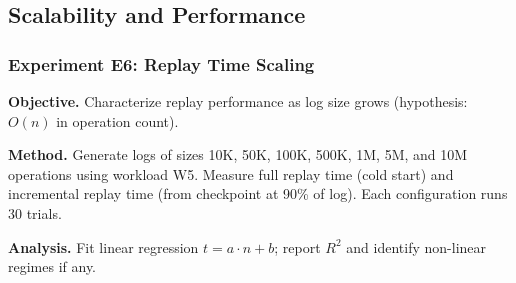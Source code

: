 \subsection{Scalability and Performance}\label{subsec:scalability}

\subsubsection{Experiment E6: Replay Time Scaling}
\textbf{Objective.} Characterize replay performance as log size grows (hypothesis: $O(n)$ in operation count).

\textbf{Method.} Generate logs of sizes 10K, 50K, 100K, 500K, 1M, 5M, and 10M operations using workload W5. Measure full replay time (cold start) and incremental replay time (from checkpoint at 90\% of log). Each configuration runs 30 trials.

\textbf{Analysis.} Fit linear regression $t = a \cdot n + b$; report $R^2$ and identify non-linear regimes if any.



